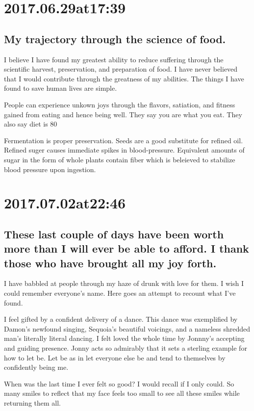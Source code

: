\begin{enumerate}
\begin{enumerate}
\section*{ 2017.06.29at17:39 }
\subsection*{ My trajectory through the science of food. }
I believe I have found my greatest ability to reduce suffering through the scientific harvest, preservation, and preparation of food. I have never believed that I would contribute through the greatness of my abilities. The things I have found to save human lives are simple.

People can experience unkown joys through the flavors, satiation, and fitness gained from eating and hence being well. They say you are what you eat. They also say diet is 80%

Fermentation is proper preservation. Seeds are a good substitute for refined oil. Refined suger causes immediate spikes in blood-pressure. Equivalent amounts of sugar in the form of whole plants contain fiber which is beleieved to stabilize blood pressure upon ingestion.

\section*{ 2017.07.02at22:46 }
\subsection*{ These last couple of days have been worth more than I will ever be able to afford. I thank those who have brought all my joy forth. }
I have babbled at people through my haze of drunk with love for them. I wish I could remember everyone's name. Here goes an attempt to recount what I've found.

I feel gifted by a confident delivery of a dance. This dance was exemplified by Damon's newfound singing, Sequoia's beautiful voicings, and a nameless shredded man's literally literal dancing. I felt loved the whole time by Jonnny's accepting and guiding presence. Jonny acts so admirably that it sets a sterling example for how to let be. Let be as in let everyone else be and tend to themselves by confidently being me.

When was the last time I ever felt so good? I would recall if I only could. So many smiles to reflect that my face feels too small to see all these smiles while returning them all.


\end{enumerate}
\end{enumerate}

